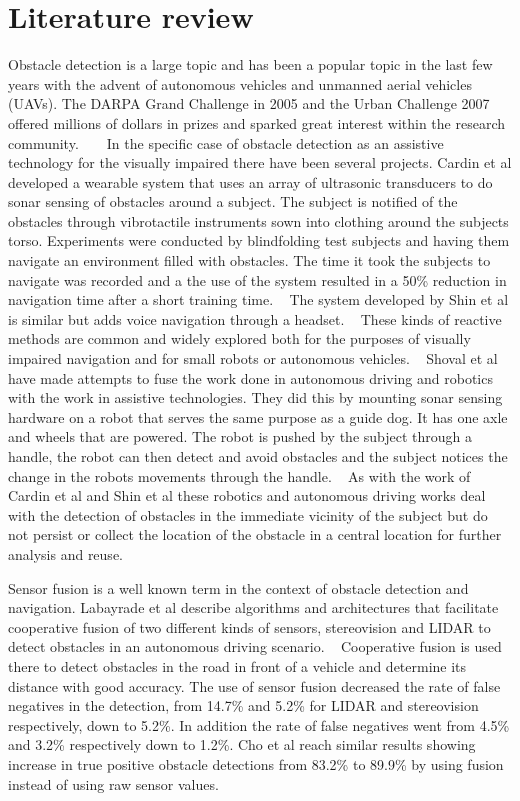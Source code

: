 \documentclass[prodmode,acmtecs]{acmsmall} %
\begin{document}
\section{Literature review}
Obstacle detection is a large topic and has been a popular topic in the last few years with the advent of autonomous vehicles and unmanned aerial vehicles (UAVs).
The DARPA Grand Challenge in 2005 and the Urban Challenge 2007 offered millions of dollars in prizes and sparked great interest within the research community. ~\cite{DARPAGrandChallenge2005} ~\cite{DARPAUrbanChallenge2007}
In the specific case of obstacle detection as an assistive technology for the visually impaired there have been several projects. Cardin et al developed a wearable system that uses an array of ultrasonic transducers to do sonar sensing of obstacles around a subject. The subject is notified of the obstacles through vibrotactile instruments sown into clothing around the subjects torso. Experiments were conducted by blindfolding test subjects and having them navigate an environment filled with obstacles. The time it took the subjects to navigate was recorded and a the use of the system resulted in a 50\% reduction in navigation time after a short training time. ~\cite{Cardin2007} The system developed by Shin et al is similar but adds voice navigation through a headset. ~\cite{Shin2007} These kinds of reactive methods are common and widely explored both for the purposes of visually impaired navigation and for small robots or autonomous vehicles. ~\cite{Kato2002}
Shoval et al have made attempts to fuse the work done in autonomous driving and robotics with the work in assistive technologies. They did this by mounting sonar sensing hardware on a robot that serves the same purpose as a guide dog. It has one axle and wheels that are powered. The robot is pushed by the subject through a handle, the robot can then detect and avoid obstacles and the subject notices the change in the robots movements through the handle. ~\cite{Shoval2003}
As with the work of Cardin et al and Shin et al these robotics and autonomous driving works deal with the detection of obstacles in the immediate vicinity of the subject but do not persist or collect the location of the obstacle in a central location for further analysis and reuse.

Sensor fusion is a well known term in the context of obstacle detection and navigation. Labayrade et al describe algorithms and architectures that facilitate cooperative fusion of two different kinds of sensors, stereovision and LIDAR to detect obstacles in an autonomous driving scenario. ~\cite{Labayrade2005} Cooperative fusion is used there to detect obstacles in the road in front of a vehicle and determine its distance with good accuracy. The use of sensor fusion decreased the rate of false negatives in the detection, from 14.7\% and 5.2\% for LIDAR and stereovision respectively, down to 5.2\%. In addition the rate of false negatives went from 4.5\% and 3.2\% respectively down to 1.2\%. Cho et al reach similar results showing increase in true positive obstacle detections from 83.2\% to 89.9\% by using fusion instead of using raw sensor values.~\cite{Cho2014}
\end{document}
